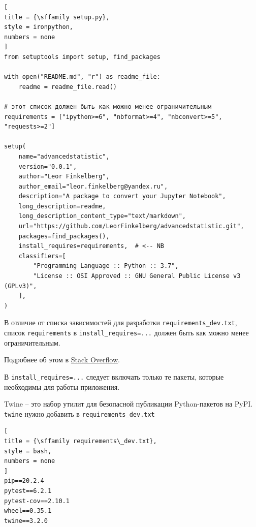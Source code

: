 \documentclass[%
	11pt,
	a4paper,
	utf8,
		]{article}
\begin{document}
\begin{lstlisting}[
title = {\sffamily setup.py},
style = ironpython,
numbers = none	
]
from setuptools import setup, find_packages

with open("README.md", "r") as readme_file:
    readme = readme_file.read()

# этот список должен быть как можно менее ограничительным
requirements = ["ipython>=6", "nbformat>=4", "nbconvert>=5", "requests>=2"]

setup(
    name="advancedstatistic",
    version="0.0.1",
    author="Leor Finkelberg",
    author_email="leor.finkelberg@yandex.ru",
    description="A package to convert your Jupyter Notebook",
    long_description=readme,
    long_description_content_type="text/markdown",
    url="https://github.com/LeorFinkelberg/advancedstatistic.git",
    packages=find_packages(),
    install_requires=requirements,  # <-- NB
    classifiers=[
        "Programming Language :: Python :: 3.7",
        "License :: OSI Approved :: GNU General Public License v3 (GPLv3)",
    ],
)
\end{lstlisting}


В отличие от списка зависимостей для разработки \texttt{requirements\_dev.txt}, список \texttt{requirements} в \texttt{install\_requires=...} должен быть как можно менее ограничительным.

Подробнее об этом в \href{https://stackoverflow.com/questions/14399534/reference-requirements-txt-for-the-install-requires-kwarg-in-setuptools-setup-py/33685899#33685899}{Stack Overflow}.

В \texttt{install\_requires=...} следует включать только те пакеты, которые необходимы для работы приложения.


Twine \url{} -- это набор утилит для безопасной публикации Python-пакетов на PyPI. \texttt{twine} нужно добавить в \texttt{requirements\_dev.txt}
\begin{lstlisting}[
title = {\sffamily requirements\_dev.txt},
style = bash,
numbers = none	
]
pip==20.2.4
pytest==6.2.1
pytest-cov==2.10.1
wheel==0.35.1
twine==3.2.0
\end{lstlisting}
\end{document}
